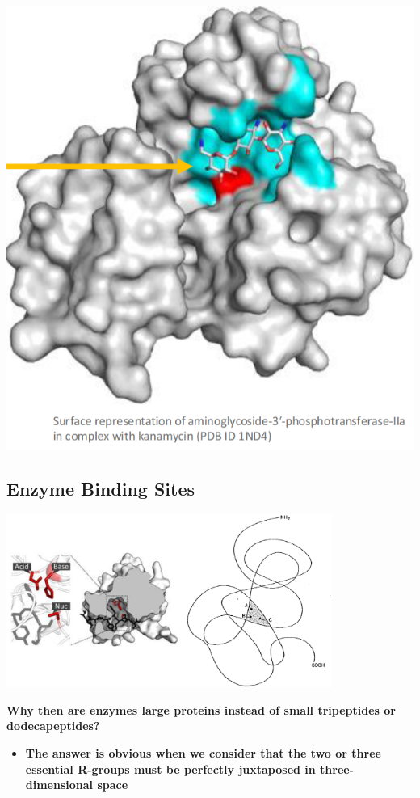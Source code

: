 \documentclass[10pt]{article}
\begin{document}
\begin{center}
    \includegraphics*[scale=0.5]{L1_4.png}
\end{center}

\subsection*{Enzyme Binding Sites}
\begin{center}
    \includegraphics*[width=0.8\textwidth]{L1_5.png}
\end{center}
\textbf{Why then are enzymes large proteins instead of small tripeptides or dodecapeptides?}
\begin{itemize}
    \item \textbf{The answer is obvious when we consider that the two or three essential R-groups must be perfectly juxtaposed in three-dimensional space}
\end{itemize}
\end{document}
